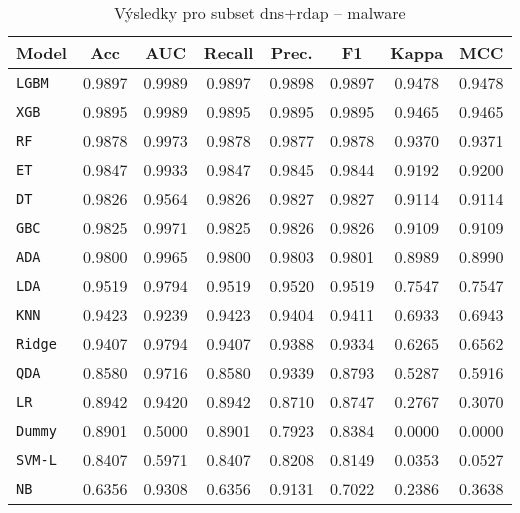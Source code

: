 \begin{table}[H]
  \centering
  \small
  \caption{Výsledky pro subset dns+rdap – malware}
  \begin{tabular}{|l|c|c|c|c|c|c|c|}
    \hline
    \textbf{Model} & \textbf{Acc} & \textbf{AUC} & \textbf{Recall} & \textbf{Prec.} & \textbf{F1} & \textbf{Kappa} & \textbf{MCC} \\
    \hline
    \texttt{LGBM} & 0.9897 & 0.9989 & 0.9897 & 0.9898 & 0.9897 & 0.9478 & 0.9478 \\
    \texttt{XGB} & 0.9895 & 0.9989 & 0.9895 & 0.9895 & 0.9895 & 0.9465 & 0.9465 \\
    \texttt{RF} & 0.9878 & 0.9973 & 0.9878 & 0.9877 & 0.9878 & 0.9370 & 0.9371 \\
    \texttt{ET} & 0.9847 & 0.9933 & 0.9847 & 0.9845 & 0.9844 & 0.9192 & 0.9200 \\
    \texttt{DT} & 0.9826 & 0.9564 & 0.9826 & 0.9827 & 0.9827 & 0.9114 & 0.9114 \\
    \texttt{GBC} & 0.9825 & 0.9971 & 0.9825 & 0.9826 & 0.9826 & 0.9109 & 0.9109 \\
    \texttt{ADA} & 0.9800 & 0.9965 & 0.9800 & 0.9803 & 0.9801 & 0.8989 & 0.8990 \\
    \texttt{LDA} & 0.9519 & 0.9794 & 0.9519 & 0.9520 & 0.9519 & 0.7547 & 0.7547 \\
    \texttt{KNN} & 0.9423 & 0.9239 & 0.9423 & 0.9404 & 0.9411 & 0.6933 & 0.6943 \\
    \texttt{Ridge} & 0.9407 & 0.9794 & 0.9407 & 0.9388 & 0.9334 & 0.6265 & 0.6562 \\
    \texttt{QDA} & 0.8580 & 0.9716 & 0.8580 & 0.9339 & 0.8793 & 0.5287 & 0.5916 \\
    \texttt{LR} & 0.8942 & 0.9420 & 0.8942 & 0.8710 & 0.8747 & 0.2767 & 0.3070 \\
    \texttt{Dummy} & 0.8901 & 0.5000 & 0.8901 & 0.7923 & 0.8384 & 0.0000 & 0.0000 \\
    \texttt{SVM-L} & 0.8407 & 0.5971 & 0.8407 & 0.8208 & 0.8149 & 0.0353 & 0.0527 \\
    \texttt{NB} & 0.6356 & 0.9308 & 0.6356 & 0.9131 & 0.7022 & 0.2386 & 0.3638 \\
    \hline
  \end{tabular}
\end{table}
\vspace{0.5cm}

